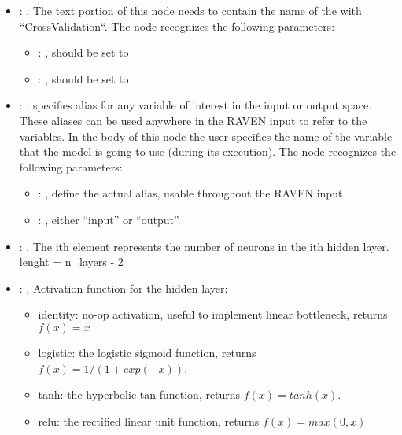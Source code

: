 \begin{itemize}
    \item {}: , 
      The text portion of this node needs to contain the name of the  with
               ``CrossValidation``.
      The  node recognizes the following parameters:
        \begin{itemize}
          \item {}: , 
            should be set to 
          \item {}: , 
            should be set to 
      \end{itemize}

    \item {}: , 
      specifies alias for         any variable of interest in the input or output space. These
      aliases can be used anywhere in the RAVEN input to         refer to the variables. In the body
      of this node the user specifies the name of the variable that the model is going to use
      (during its execution).
      The  node recognizes the following parameters:
        \begin{itemize}
          \item {}: , 
            define the actual alias, usable throughout the RAVEN input
          \item {}: , 
            either ``input'' or ``output''.
      \end{itemize}

    \item {}: , 
      The ith element represents the number of neurons in the ith hidden layer.
      lenght = n\_layers - 2

    \item {}: , 
      Activation function for the hidden layer:
      \begin{itemize}                                                   \item identity:  no-op
      activation, useful to implement linear bottleneck, returns $f(x) = x$
      \item logistic: the logistic sigmoid function, returns $f(x) = 1 / (1 + exp(-x))$.
      \item tanh: the hyperbolic tan function, returns $f(x) = tanh(x)$.
      \item relu:  the rectified linear unit function, returns $f(x) = max(0, x)$
      \end{itemize}


\end{itemize}

